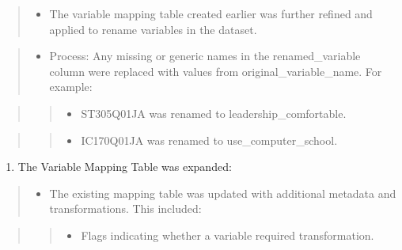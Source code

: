 \documentclass[
]{article}
\providecommand{\tightlist}{%
  \setlength{\itemsep}{0pt}\setlength{\parskip}{0pt}}
\begin{document}
\begin{quote}
\begin{itemize}
\tightlist
\item
  The variable mapping table created earlier was further refined and
  applied to rename variables in the dataset.
\end{itemize}
\end{quote}

\begin{quote}
\begin{itemize}
\tightlist
\item
  Process: Any missing or generic names in the renamed\_variable column
  were replaced with values from original\_variable\_name. For example:
\end{itemize}
\end{quote}

\begin{quote}
\begin{quote}
\begin{itemize}
\tightlist
\item
  ST305Q01JA was renamed to leadership\_comfortable.
\end{itemize}
\end{quote}
\end{quote}

\begin{quote}
\begin{quote}
\begin{itemize}
\tightlist
\item
  IC170Q01JA was renamed to use\_computer\_school.
\end{itemize}
\end{quote}
\end{quote}

\begin{enumerate}
\def\labelenumi{\arabic{enumi}.}
\setcounter{enumi}{4}
\tightlist
\item
  The Variable Mapping Table was expanded:
\end{enumerate}

\begin{quote}
\begin{itemize}
\tightlist
\item
  The existing mapping table was updated with additional metadata and
  transformations. This included:
\end{itemize}
\end{quote}

\begin{quote}
\begin{quote}
\begin{itemize}
\tightlist
\item
  Flags indicating whether a variable required transformation.
\end{itemize}
\end{quote}
\end{quote}
\end{document}
